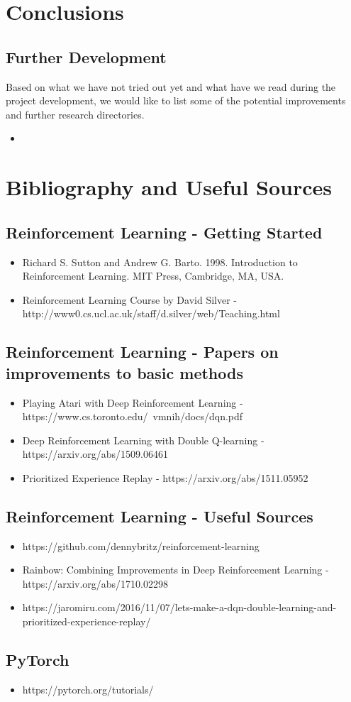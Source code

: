 \documentclass{article}
\begin{document}
 

\section{Conclusions}
\subsection{Further Development}
Based on what we have not tried out yet and what have we read during the project development, we would like to list some of the potential improvements and further research directories.

\begin{itemize}
\item
\end{itemize}
\newpage
\section{Bibliography and Useful Sources}
\subsection{Reinforcement Learning - Getting Started}
\begin{itemize}
\item Richard S. Sutton and Andrew G. Barto. 1998. Introduction to Reinforcement Learning. MIT Press, Cambridge, MA, USA.
\item Reinforcement Learning Course by David Silver - http://www0.cs.ucl.ac.uk/staff/d.silver/web/Teaching.html
\end{itemize}
\subsection{Reinforcement Learning - Papers on improvements to basic methods}
\begin{itemize}
\item Playing Atari with Deep Reinforcement Learning - https://www.cs.toronto.edu/~vmnih/docs/dqn.pdf
\item 
Deep Reinforcement Learning with Double Q-learning - https://arxiv.org/abs/1509.06461
\item Prioritized Experience Replay - https://arxiv.org/abs/1511.05952
\end{itemize}
\subsection{Reinforcement Learning - Useful Sources}
\begin{itemize}
\item https://github.com/dennybritz/reinforcement-learning
\item 
Rainbow: Combining Improvements in Deep Reinforcement Learning - https://arxiv.org/abs/1710.02298
\item https://jaromiru.com/2016/11/07/lets-make-a-dqn-double-learning-and-prioritized-experience-replay/
\end{itemize}
\subsection{PyTorch}
\begin{itemize}
\item https://pytorch.org/tutorials/
\end{itemize}
\end{document}
